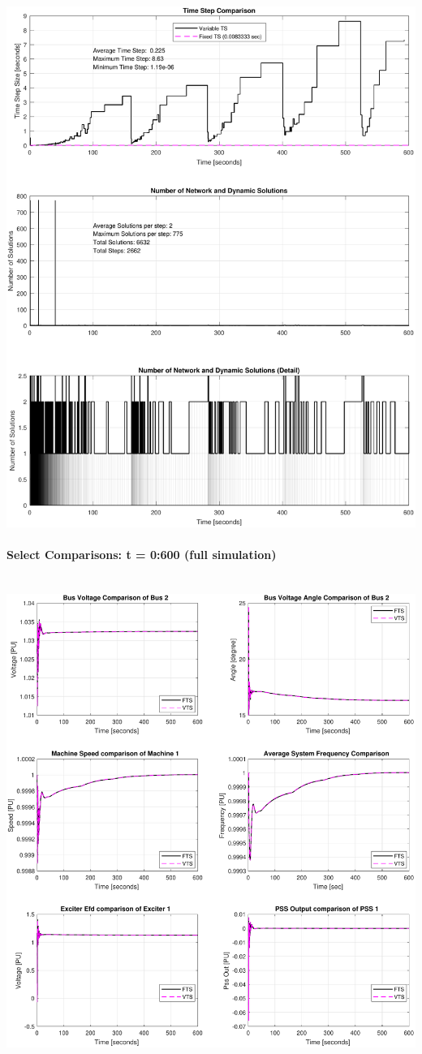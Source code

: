 \documentclass[12pt]{article}
\begin{document}
\includegraphics[width=\linewidth]{MWstepComp}

\pagebreak
\paragraph{Select Comparisons: t = 0:600 (full simulation)} \ \\

\includegraphics[width=\linewidth]{MWdetailFull}
\end{document}
